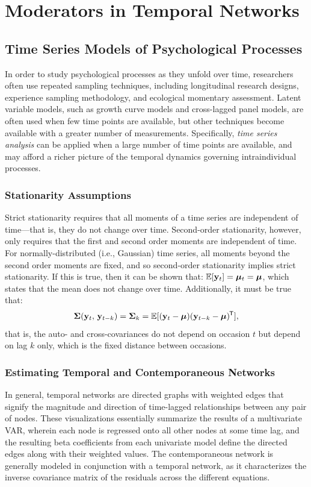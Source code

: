 \chapter{Moderators in Temporal Networks}
\section{Time Series Models of Psychological Processes}
In order to study psychological processes as they unfold over time, researchers often use repeated sampling techniques, including longitudinal research designs, experience sampling methodology, and ecological momentary assessment. Latent variable models, such as growth curve models and cross-lagged panel models, are often used when few time points are available, but other techniques become available with a greater number of measurements. Specifically, \textit{time series analysis} can be applied when a large number of time points are available, and may afford a richer picture of the temporal dynamics governing intraindividual processes.

\subsection{Stationarity Assumptions}
Strict stationarity requires that all moments of a time series are independent of time---that is, they do not change over time. Second-order stationarity, however, only requires that the first and second order moments are independent of time. For normally-distributed (i.e., Gaussian) time series, all moments beyond the second order moments are fixed, and so second-order stationarity implies strict stationarity. If this is true, then it can be shown that: $\mathbb{E}\lbrack{\mathbf{y}_t}\rbrack = \bm{\mu}_t = \bm{\mu}$, which states that the mean does not change over time. Additionally, it must be true that:
\begin{equation}
    \bm{\Sigma}(\mathbf{y}_t,\,\mathbf{y}_{t-k}) = \bm{\Sigma}_k = \mathbb{E}\lbrack{(\mathbf{y}_t - \bm{\mu})(\mathbf{y}_{t-k} - \bm{\mu})^{\mkern-1.5mu\mathsf{T}}}\rbrack,
\end{equation}
that is, the auto- and cross-covariances do not depend on occasion $t$ but depend on lag $k$ only, which is the fixed distance between occasions. 

\subsection{Estimating Temporal and Contemporaneous Networks}
In general, temporal networks are directed graphs with weighted edges that signify the magnitude and direction of time-lagged relationships between any pair of nodes. These visualizations essentially summarize the results of a multivariate VAR, wherein each node is regressed onto all other nodes at some time lag, and the resulting beta coefficients from each univariate model define the directed edges along with their weighted values. The contemporaneous network is generally modeled in conjunction with a temporal network, as it characterizes the inverse covariance matrix of the residuals across the different equations. 

